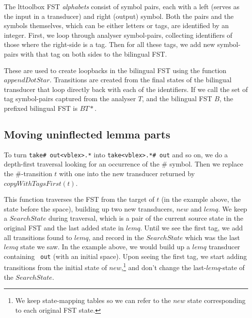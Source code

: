 \documentclass[10pt, a4paper]{article}
\newcommand{\ana}[1]{\texttt{#1}}
\begin{document}
The lttoolbox FST \emph{alphabets} consist of symbol pairs, each with
a left (serves as the input in a transducer) and right (output)
symbol. Both the pairs and the symbols themselves, which can be either
letters or tags, are identified by an integer. First, we loop through
analyser symbol-pairs, collecting identifiers of those where the
right-side is a tag. Then for all these tags, we add new symbol-pairs
with that tag on both sides to the bilingual FST.

These are used to create loopbacks in the bilingual FST using the
function $appendDotStar$. Transitions are created from the final
states of the bilingual transducer that loop directly back with each
of the identifiers. If we call the set of tag symbol-pairs captured
from the analyser $T$, and the bilingual FST $B$, the prefixed
bilingual FST is $B T*$.

\subsection{Moving uninflected lemma parts}
\label{sec:lemqmove}

To turn \ana{take\# out<vblex>.*} into \ana{take<vblex>.*\# out} and
so on, we do a depth-first traversal looking for an occurrence of the
\# symbol. Then we replace the \#-transition $t$ with one into the new
transducer returned by $copyWithTagsFirst(t)$. 

This function traverses the FST from the target of $t$ (in the example
above, the state before the space), building up two new transducers,
$new$ and $lemq$. We keep a $SearchState$ during traversal, which is a
pair of the current source state in the original FST and the last
added state in $lemq$. Until we see the first tag, we add all
transitions found to $lemq$, and record in the $SearchState$ which was
the last $lemq$ state we saw. In the example above, we would build up
a $lemq$ transducer containing \ana{ out} (with an initial space).
Upon seeing the first tag, we start adding transitions from the
initial state of $new$,\footnote{We keep state-mapping tables so we
can refer to the $new$ state corresponding to each original FST
state.} and don't change the last-$lemq$-state of the $SearchState$.
\end{document}
